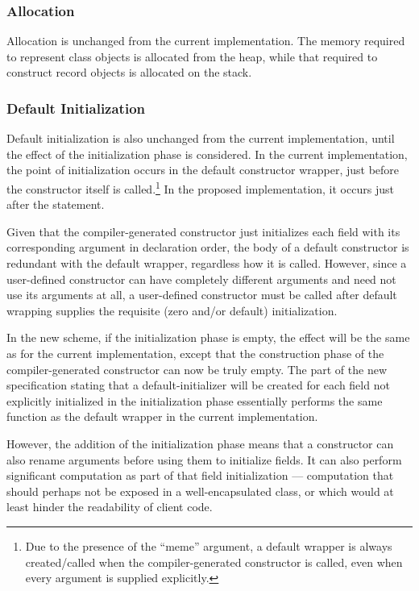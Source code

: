 \subsubsection{Allocation}

Allocation is unchanged from the current implementation.  The memory
required to represent class objects is allocated from the heap, while that
required to construct record objects is allocated on the stack.  

\subsubsection{Default Initialization} 
Default initialization is also unchanged from the current
implementation, until the effect of the initialization phase is considered.  In
the current implementation, the point of initialization occurs in the default
constructor wrapper, just before the constructor itself is called.\footnote{Due
to the presence of the ``meme'' argument, a default wrapper is always
created/called when the compiler-generated constructor is called, even when
every argument is supplied explicitly.}  In the proposed implementation, it
occurs just after the  statement.

Given that the compiler-generated
constructor just initializes each field with its corresponding argument in
declaration order, the body of a default constructor is redundant with the
default wrapper, regardless how it is called.  However, since a user-defined
constructor can have completely different arguments and need not use its
arguments at all, a user-defined constructor must be called after default
wrapping supplies the requisite (zero and/or default) initialization.

In the new scheme, if the initialization phase is empty, the effect will
be the same as for the current implementation, except that the construction phase of the
compiler-generated constructor can now be truly empty.  The part of the
new specification stating that a default-initializer will be created for each
field not explicitly initialized in the initialization phase essentially
performs the same function as the default wrapper in the current implementation.

However, the addition of the initialization phase means that a
constructor can also rename arguments before using them to initialize fields.
It can also perform significant computation as part of that field initialization
--- computation that should perhaps not be exposed in a well-encapsulated class,
or which would at least hinder the readability of client code.

